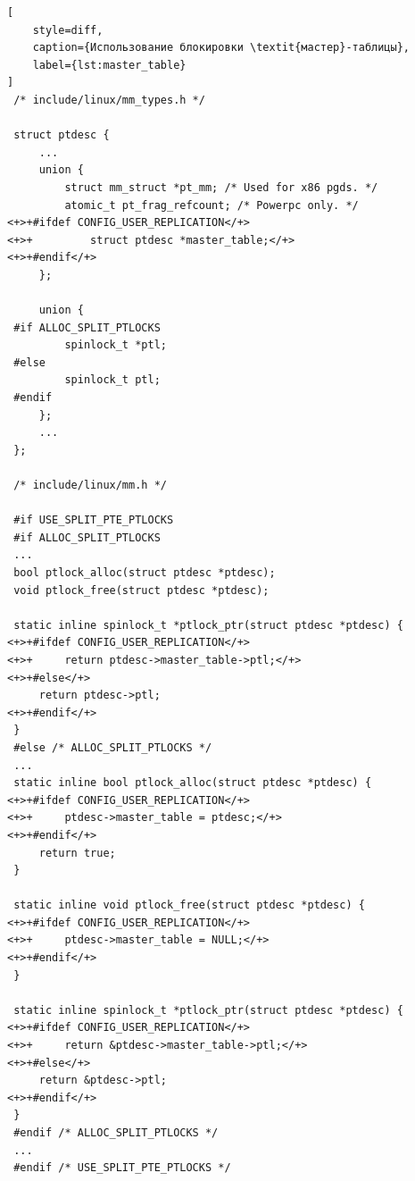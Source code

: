 \begin{lstlisting}[
	style=diff,
	caption={Использование блокировки \textit{мастер}-таблицы},
	label={lst:master_table}
]
 /* include/linux/mm_types.h */

 struct ptdesc {
	 ...
	 union {
		 struct mm_struct *pt_mm; /* Used for x86 pgds. */
		 atomic_t pt_frag_refcount; /* Powerpc only. */
<+>+#ifdef CONFIG_USER_REPLICATION</+>
<+>+		 struct ptdesc *master_table;</+>
<+>+#endif</+>
	 };

	 union {
 #if ALLOC_SPLIT_PTLOCKS
		 spinlock_t *ptl;
 #else
		 spinlock_t ptl;
 #endif
	 };
	 ...
 };

 /* include/linux/mm.h */

 #if USE_SPLIT_PTE_PTLOCKS
 #if ALLOC_SPLIT_PTLOCKS
 ...
 bool ptlock_alloc(struct ptdesc *ptdesc);
 void ptlock_free(struct ptdesc *ptdesc);

 static inline spinlock_t *ptlock_ptr(struct ptdesc *ptdesc) {
<+>+#ifdef CONFIG_USER_REPLICATION</+>
<+>+	 return ptdesc->master_table->ptl;</+>
<+>+#else</+>
	 return ptdesc->ptl;
<+>+#endif</+>
 }
 #else /* ALLOC_SPLIT_PTLOCKS */
 ...
 static inline bool ptlock_alloc(struct ptdesc *ptdesc) {
<+>+#ifdef CONFIG_USER_REPLICATION</+>
<+>+	 ptdesc->master_table = ptdesc;</+>
<+>+#endif</+>
	 return true;
 }

 static inline void ptlock_free(struct ptdesc *ptdesc) {
<+>+#ifdef CONFIG_USER_REPLICATION</+>
<+>+	 ptdesc->master_table = NULL;</+>
<+>+#endif</+>
 }

 static inline spinlock_t *ptlock_ptr(struct ptdesc *ptdesc) {
<+>+#ifdef CONFIG_USER_REPLICATION</+>
<+>+	 return &ptdesc->master_table->ptl;</+>
<+>+#else</+>
	 return &ptdesc->ptl;
<+>+#endif</+>
 }
 #endif /* ALLOC_SPLIT_PTLOCKS */
 ...
 #endif /* USE_SPLIT_PTE_PTLOCKS */
\end{lstlisting}
\vspace{0.5cm}


